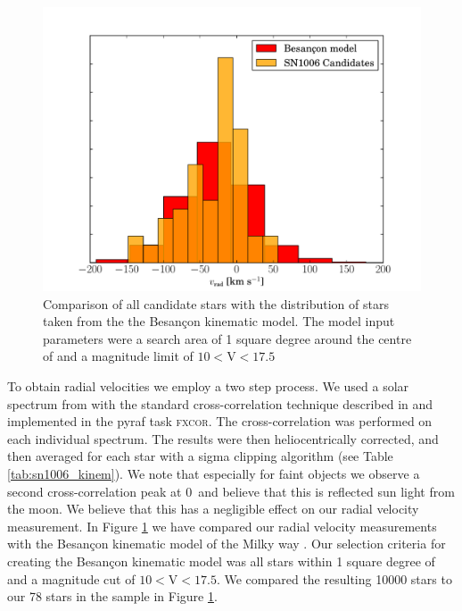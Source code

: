 \begin{figure}[tb] %
   \centering
   \includegraphics[width=\textwidth]{chapter_sn1006/plots/sn1006_vrad_besancon.pdf} 
   \caption[Radial velocity of all candidates in SN 1006 compared with Besan\c{c}on Model]{Comparison of all candidate stars with the distribution of stars taken from the the Besan\c{c}on kinematic model. The model input parameters were a search area of 1 square degree around the centre of  and a magnitude limit of $10<\textrm{V}<17.5$}
   \label{fig:sn1006_vrad_comp}
\end{figure}


To obtain radial velocities we employ a two step process. We used a solar spectrum from \citet{1984sfat.book.....K} with the standard cross-correlation technique described in \citet{1979AJ.....84.1511T} and implemented in the \gls{pyraf} task \textsc{fxcor}. The cross-correlation was performed on each individual spectrum. The results were then heliocentrically corrected, and then averaged for each star with a sigma clipping algorithm (see Table \ref{tab:sn1006_kinem}). We note that especially for faint objects we observe a second cross-correlation peak at 0~\kms and believe that this is reflected sun light from the moon. We believe that this has a negligible effect on our radial velocity measurement.
In Figure \ref{fig:sn1006_vrad_comp} we have compared our radial velocity measurements with the Besan\c{c}on kinematic model of the Milky way \citep{2003A&A...409..523R}. Our selection criteria for creating the  Besan\c{c}on kinematic model was all stars within 1 square degree of  and a magnitude cut of $10<\textrm{V}<17.5$. We compared the resulting 10000 stars to our 78 stars in the sample in Figure \ref{fig:sn1006_vrad_comp}. 




